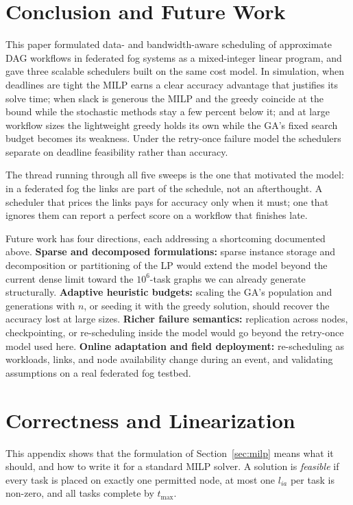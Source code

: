 \documentclass[conference]{IEEEtran}
\begin{document}
\section{Conclusion and Future Work}

This paper formulated data- and bandwidth-aware scheduling of approximate DAG workflows in federated fog systems as a mixed-integer linear program, and gave three scalable schedulers built on the same cost model. In simulation, when deadlines are tight the MILP earns a clear accuracy advantage that justifies its solve time; when slack is generous the MILP and the greedy coincide at the bound while the stochastic methods stay a few percent below it; and at large workflow sizes the lightweight greedy holds its own while the GA's fixed search budget becomes its weakness. Under the retry-once failure model the schedulers separate on deadline feasibility rather than accuracy.

The thread running through all five sweeps is the one that motivated the model: in a federated fog the links are part of the schedule, not an afterthought. A scheduler that prices the links pays for accuracy only when it must; one that ignores them can report a perfect score on a workflow that finishes late.

Future work has four directions, each addressing a shortcoming documented above. \textbf{Sparse and decomposed formulations:} sparse instance storage and decomposition or partitioning of the LP would extend the model beyond the current dense limit toward the $10^6$-task graphs we can already generate structurally. \textbf{Adaptive heuristic budgets:} scaling the GA's population and generations with $n$, or seeding it with the greedy solution, should recover the accuracy lost at large sizes. \textbf{Richer failure semantics:} replication across nodes, checkpointing, or re-scheduling inside the model would go beyond the retry-once model used here. \textbf{Online adaptation and field deployment:} re-scheduling as workloads, links, and node availability change during an event, and validating assumptions on a real federated fog testbed.

\appendix
\section{Correctness and Linearization}
\label{app:proofs}

This appendix shows that the formulation of Section~\ref{sec:milp} means what it should, and how to write it for a standard MILP solver. A solution is \emph{feasible} if every task is placed on exactly one permitted node, at most one $l_{ia}$ per task is non-zero, and all tasks complete by $t_{\max}$.
\end{document}
